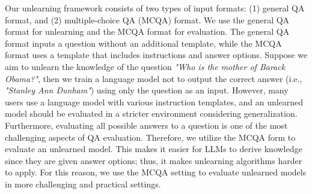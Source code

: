 Our unlearning framework consists of two types of input formats: (1) general QA format, and (2) multiple-choice QA (MCQA) format. We use the general QA format for unlearning and the MCQA format for evaluation.
The general QA format inputs a question without an additional template, while the MCQA format uses a template that includes instructions and answer options.
Suppose we aim to unlearn the knowledge of the question \textit{"Who is the mother of Barack Obama?"}, then we train a language model not to output the correct answer (i.e., \textit{"Stanley Ann Dunham"}) using only the question as an input.
However, many users use a language model with various instruction templates, and an unlearned model should be evaluated in a stricter environment considering generalization.
Furthermore, evaluating all possible answers to a question is one of the most challenging aspects of QA evaluation.
Therefore, we utilize the MCQA form to evaluate an unlearned model.
This makes it easier for LLMs to derive knowledge since they are given answer options; thus, it makes unlearning algorithms harder to apply.
For this reason, we use the MCQA setting to evaluate unlearned models in more challenging and practical settings.




